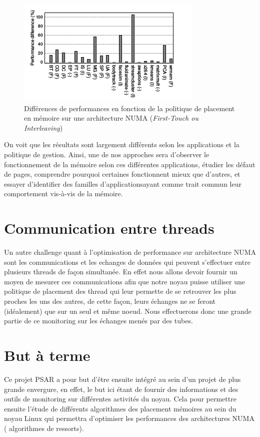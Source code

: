     \begin{figure}[!h]
      \centering
      \includegraphics[scale=0.65]{img/numa_memory_policy}
      \caption{Différences de performances en fonction de la politique de
        placement en mémoire sur une architecture NUMA (\textit{First-Touch ou Interleaving})}
    \end{figure}

    On voit que les résultats sont largement différents selon les applications
    et la politique de gestion. Ainsi, une de nos approches sera d'observer le
    fonctionnement de la mémoire selon ces différentes applications, étudier les
    défaut de pages, comprendre pourquoi certaines fonctionnent mieux que
    d'autres, et essayer d'identifier des \og familles d'applications\fg ayant
    comme trait commun leur comportement vis-à-vis de la mémoire.
    
  \section{Communication entre threads}
    
    Un autre challenge quant à l'optimisation de performance sur architecture 
    NUMA sont les communications et les echanges de données qui peuvent s'effectuer entre 
    plusieurs threads de façon simultanée. En effet nous allons devoir fournir un moyen
    de mesurer ces communications afin que notre noyau 
    puisse utiliser une politique de placement des thread qui leur permette de 
    se retrouver les plus proches les uns des autres, de cette façon, leurs échanges 
    ne se feront (idéalement) que sur un seul et même noeud. Nous effectuerons donc
    une grande partie de ce monitoring sur les échanges menés par des tubes.

  \section{But à terme}

    Ce projet PSAR a pour but d'être ensuite intégré au sein d'un projet de plus grande 
    envergure, en effet, le but ici étant de fournir des informations et des outils
    de monitoring sur différentes activités du noyau. Cela pour permettre ensuite 
    l'étude de différents algorithmes des placement mémoires au sein du noyau Linux
    qui permettra d'optimiser les performances des architectures NUMA (
    algorithmes de \og ressorts\fg).
